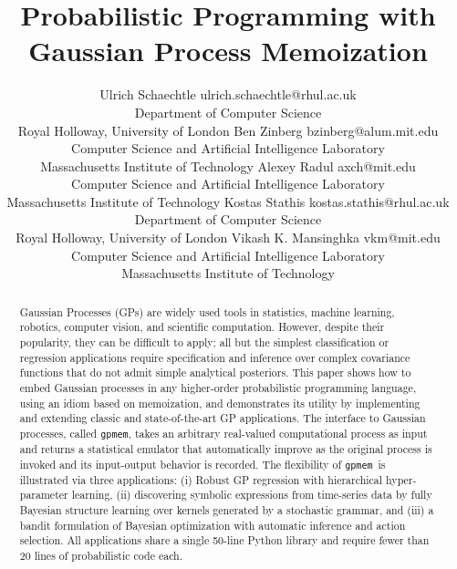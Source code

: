 \documentclass[twoside,11pt]{article}
\newcommand{\gpmem}{\texttt{gpmem}}
\begin{document}
\title{Probabilistic Programming with Gaussian Process Memoization}


\author{\name Ulrich Schaechtle \email ulrich.schaechtle@rhul.ac.uk \\
	      \addr Department of Computer Science\\
              Royal Holloway, University of London
       \AND \name Ben Zinberg \email bzinberg@alum.mit.edu \\
              \addr Computer Science and Artificial Intelligence Laboratory\\
              Massachusetts Institute of Technology
       \AND \name Alexey Radul \email axch@mit.edu \\
              \addr Computer Science and Artificial Intelligence Laboratory\\
              Massachusetts Institute of Technology
       \AND \name Kostas Stathis \email kostas.stathis@rhul.ac.uk\\
              \addr Department of Computer Science\\
       Royal Holloway, University of London
       \AND \name Vikash K. Mansinghka \email vkm@mit.edu \\
	      \addr Computer Science and Artificial Intelligence Laboratory\\
	      Massachusetts Institute of Technology
} 


\maketitle
\noindent\begin{abstract}
Gaussian Processes (GPs) are widely used tools in statistics, machine learning, robotics, computer vision, and scientific computation. However, despite their popularity, they can be difficult to apply; all but the simplest classification or regression applications require specification and inference over complex covariance functions that do not admit simple analytical posteriors. This paper shows how to embed Gaussian processes in any higher-order probabilistic programming language, using an idiom based on memoization, and demonstrates its utility by implementing and extending classic and state-of-the-art GP applications. The interface to Gaussian processes, called \gpmem, takes an arbitrary real-valued computational process as input and returns a statistical emulator that automatically improve as the original process is invoked and its input-output behavior is recorded.  The flexibility of \gpmem\ is illustrated via three applications: (i) Robust GP regression with hierarchical hyper-parameter learning, (ii) discovering symbolic expressions from time-series data by fully Bayesian structure learning over kernels generated by a stochastic grammar, and (iii) a bandit formulation of Bayesian optimization with automatic inference and action selection. All applications share a single 50-line Python library and require fewer than 20 lines of probabilistic code each.
\end{abstract}
\end{document}

